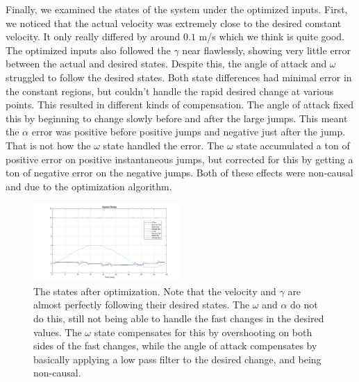 \documentclass[journal]{IEEEtran}
\begin{document}
Finally, we examined the states of the system under the optimized inputs. First, we noticed that the actual velocity was extremely close to the desired constant velocity. It only really differed by around $0.1$ m/s which we think is quite good. The optimized inputs also followed the $\gamma$ near flawlessly, showing very little error between the actual and desired states. Despite this, the angle of attack and $\omega$ struggled to follow the desired states. Both state differences had minimal
error in the constant regions, but couldn't handle the rapid desired change at various points. This resulted in different kinds of compensation. The angle of attack fixed this by beginning to change slowly before and after the large jumps. This meant the $\alpha$ error was positive before positive jumps and negative just after the jump. That is not how the $\omega$ state handled the error. The $\omega$ state accumulated a ton of positive error on positive instantaneous jumps, but corrected for this by getting a ton of negative error on the negative jumps. Both of these effects were non-causal and due to the optimization algorithm.
\begin{figure}[H]
    \centering
    \includegraphics[width=0.5\textwidth]{Optimized_States.png}
    \caption{The states after optimization. Note that the velocity and $\gamma$ are almost perfectly following their desired states. The $\omega$ and $\alpha$ do not do this, still not being able to handle the fast changes in the desired values. The $\omega$ state compensates for this by overshooting on both sides of the fast changes, while the angle of attack compensates by basically applying a low pass filter to the desired change, and being non-causal.}
\end{figure}
\end{document}
